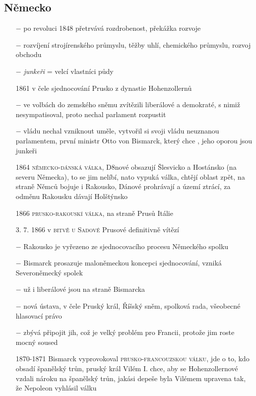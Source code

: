 \documentclass{article}
\begin{document}
\subsection*{Německo}
\begin{itemize}
    \vspace{-0.5em}
    \setlength\itemsep{0.15em}
    \item[$-$] po revoluci 1848 přetrvává rozdrobenost, překážka rozvoje
    \item[$-$] rozvíjení strojírenského průmyslu, těžby uhlí, chemického průmyslu, rozvoj obchodu
    \item[$-$] \textit{junkeři} = velcí vlastníci půdy
    \item[1861] v čele sjednocování Prusko z dynastie Hohenzollernů
    \item[$-$] ve volbách do zemského sněmu zvítězili liberálové a demokraté, s nimiž nesympatisoval, proto nechal parlament rozpustit
    \item[$-$] vládu nechal vzniknout uměle, vytvořil si svoji vládu neuznanou parlamentem, první ministr Otto von Bismarck, který chce , jeho oporou jsou junkeři
    \item[1864] \textsc{německo-dánská válka}, D8nové obsazují  Šlesvicko a Hostánsko (na severu Německa), to se jim nelíbí, nato vypuká válka, chtějí oblast zpět, na straně Němců bojuje i Rakousko, Dánové prohrávají a území ztrácí, za odměnu Rakousku dávají Holštýnsko
    \item[1866] \textsc{prusko-rakouskí válka}, na straně Prusů Itálie
    \item[3. 7. 1866] v \textsc{bitvě u Sadové} Prusové definitivně vítězí
    \item[$-$] Rakousko je vyřezeno ze sjednocovacího procesu Německého spolku
    \item[$-$] Bismarck prosazuje maloněmeckou koncepci sjednocování, vzniká Severoněmecký spolek
    \item[$-$] už i liberálové jsou na straně Bismarcka
    \item[$-$] nová ústava, v čele Pruský král, Říšský sněm, spolková rada, všeobecné hlasovací právo
    \item[$-$] zbývá připojit jih, což je velký problém pro Francii, protože jim roste mocný soused
    \item[1870-1871] Bismarck vyprovokoval \textsc{prusko-francouzskou válku}, jde o to, kdo obsadí španělský trůn, pruský král Vilém I. chce, aby se Hohenzollernové vzdali nároku na španělský trůn, jakási depeše byla Vilémem upravena tak, že Nepoleon vyhlásil válku

\end{itemize}
\end{document}
